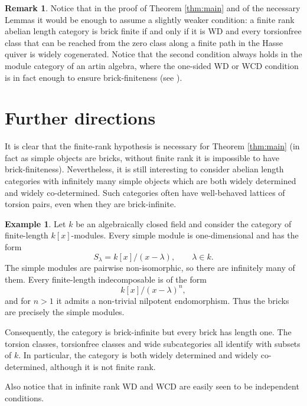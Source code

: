 \documentclass[11pt]{amsart}
\theoremstyle{definition}
\newtheorem{example}[theorem]{Example}
\newtheorem{remark}[theorem]{Remark}
\begin{document}
\begin{remark}
Notice that in the proof of Theorem \ref{thm:main} and of the necessary Lemmas it would be enough to assume a slightly weaker condition: a finite rank abelian length category is brick finite if and only if it is WD and every torsionfree class that can be reached from the zero class along a finite path in the Hasse quiver is widely cogenerated. 
Notice that the second condition always holds in the module category of an artin algebra, where the one-sided WD or WCD condition is in fact enough to ensure brick-finiteness (see \cite[Proposition 5.4]{WideCoreflective}).
\end{remark}

\section{Further directions}

It is clear that the finite-rank hypothesis is necessary for Theorem \ref{thm:main} (in fact as simple objects are bricks, without finite rank it is impossible to have brick-finiteness). Nevertheless, it is still interesting to consider abelian length categories with infinitely many simple objects which are both widely determined and widely co-determined. Such categories often have well-behaved lattices of torsion pairs, even when they are brick-infinite.

\begin{example}
Let \(k\) be an algebraically closed field and consider the category of finite-length \(k[x]\)-modules. Every simple module is one-dimensional and has the form
\[
S_\lambda=k[x]/(x-\lambda),\qquad \lambda\in k.
\]
The simple modules are pairwise non-isomorphic, so there are infinitely many of them. Every finite-length indecomposable is of the form
\[
k[x]/(x-\lambda)^n,
\]
and for \(n>1\) it admits a non-trivial nilpotent endomorphism. Thus the bricks are precisely the simple modules.

Consequently, the category is brick-infinite but every brick has length one. The torsion classes, torsionfree classes and wide subcategories all identify with subsets of \(k\). In particular, the category is both widely determined and widely co-determined, although it is not finite rank.
\end{example}

Also notice that in infinite rank WD and WCD are easily seen to be independent conditions.
\end{document}
